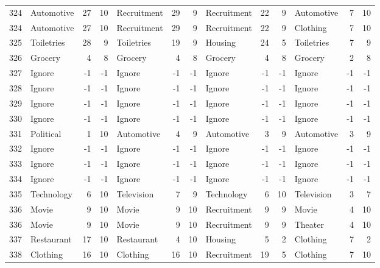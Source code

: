 \begin{figure}[htbp]
\begin{tabular}{rlrrlrrlrrlrr}
    324   & Automotive & 27    & 10    & Recruitment & 29    & 9     & Recruitment & 22    & 9     & Automotive & 7     & 10 \\
    324   & Automotive & 27    & 10    & Recruitment & 29    & 9     & Recruitment & 22    & 9     & Clothing & 7     & 10 \\
    325   & Toiletries & 28    & 9     & Toiletries & 19    & 9     & Housing & 24    & 5     & Toiletries & 7     & 9 \\
    326   & Grocery & 4     & 8     & Grocery & 4     & 8     & Grocery & 4     & 8     & Grocery & 2     & 8 \\
    327   & Ignore & -1    & -1    & Ignore & -1    & -1    & Ignore & -1    & -1    & Ignore & -1    & -1 \\
    328   & Ignore & -1    & -1    & Ignore & -1    & -1    & Ignore & -1    & -1    & Ignore & -1    & -1 \\
    329   & Ignore & -1    & -1    & Ignore & -1    & -1    & Ignore & -1    & -1    & Ignore & -1    & -1 \\
    330   & Ignore & -1    & -1    & Ignore & -1    & -1    & Ignore & -1    & -1    & Ignore & -1    & -1 \\
    331   & Political & 1     & 10    & Automotive & 4     & 9     & Automotive & 3     & 9     & Automotive & 3     & 9 \\
    332   & Ignore & -1    & -1    & Ignore & -1    & -1    & Ignore & -1    & -1    & Ignore & -1    & -1 \\
    333   & Ignore & -1    & -1    & Ignore & -1    & -1    & Ignore & -1    & -1    & Ignore & -1    & -1 \\
    334   & Ignore & -1    & -1    & Ignore & -1    & -1    & Ignore & -1    & -1    & Ignore & -1    & -1 \\
    335   & Technology & 6     & 10    & Television & 7     & 9     & Technology & 6     & 10    & Television & 3     & 7 \\
    336   & Movie & 9     & 10    & Movie & 9     & 10    & Recruitment & 9     & 9     & Movie & 4     & 10 \\
    336   & Movie & 9     & 10    & Movie & 9     & 10    & Recruitment & 9     & 9     & Theater & 4     & 10 \\
    337   & Restaurant & 17    & 10    & Restaurant & 4     & 10    & Housing & 5     & 2     & Clothing & 7     & 2 \\
    338   & Clothing & 16    & 10    & Clothing & 16    & 10    & Recruitment & 19    & 5     & Clothing & 7     & 10 \\

\end{tabular}
\end{figure}
